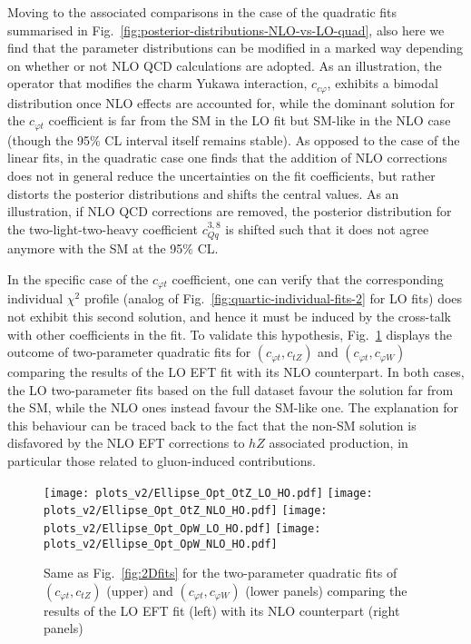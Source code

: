 Moving to the associated comparisons in the case of the quadratic fits summarised in
Fig.~\ref{fig:posterior-distributions-NLO-vs-LO-quad},
also here we find that the parameter distributions can be modified in a marked
way depending on whether or not NLO QCD calculations are adopted.
%
As an illustration, the operator that modifies the charm Yukawa interaction,
$c_{c\varphi}$, exhibits
a bimodal distribution once NLO effects are accounted for,
while the dominant solution for the $c_{\varphi t}$  coefficient
is far from the SM in the LO fit but SM-like in the NLO case
(though the 95\% CL interval itself remains stable).
%
As opposed to the case of the linear fits,
in the quadratic case one finds that the addition of NLO corrections
does not in general reduce the uncertainties
on the fit coefficients, but rather distorts
the posterior distributions and shifts the central values.
%
As an illustration,
if NLO QCD corrections are removed, the posterior
distribution for the two-light-two-heavy coefficient
$c_{Qq}^{3,8}$ is shifted such that it does not agree anymore
with the SM at the 95\% CL.


In the specific case of the $c_{\varphi t}$  coefficient, one can verify that the corresponding individual $\chi^2$ profile
(analog of Fig.~\ref{fig:quartic-individual-fits-2} for LO fits) does not
exhibit this second solution, and hence it must be induced by the cross-talk
with other coefficients in the fit.
%
To validate this hypothesis, Fig.~\ref{fig:Ellipse_Opt_OtZ_LO_HO} displays the outcome of 
 two-parameter quadratic fits for
     $(c_{\varphi t},c_{tZ})$  and $(c_{\varphi t},c_{\varphi W})$ 
 comparing the results of the LO EFT fit  with its NLO counterpart.
 In both cases, the LO two-parameter fits based on the full dataset
 favour the solution far from the SM, while the NLO ones
 instead favour the SM-like one.
 The explanation for this behaviour can be traced back
 to the fact that the non-SM solution is disfavored
 by the NLO EFT corrections to $hZ$ associated production,
 in particular those related to gluon-induced contributions.

\begin{figure}[t]
  \begin{center}
    \texttt{[image: plots\_v2/Ellipse\_Opt\_OtZ\_LO\_HO.pdf]}
    \texttt{[image: plots\_v2/Ellipse\_Opt\_OtZ\_NLO\_HO.pdf]}
    \texttt{[image: plots\_v2/Ellipse\_Opt\_OpW\_LO\_HO.pdf]}
    \texttt{[image: plots\_v2/Ellipse\_Opt\_OpW\_NLO\_HO.pdf]}
    \caption{\small
      Same as Fig.~\ref{fig:2Dfits} for the two-parameter quadratic fits
      of $(c_{\varphi t},c_{tZ})$ (upper) and $(c_{\varphi t},c_{\varphi W})$ (lower panels)
      comparing the results of the LO EFT fit (left) with its NLO counterpart (right panels)
      \label{fig:Ellipse_Opt_OtZ_LO_HO} }
  \end{center}
\end{figure}

